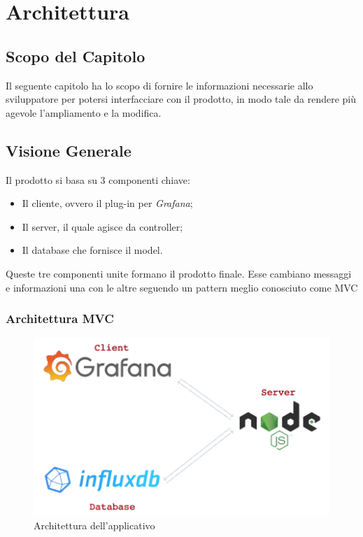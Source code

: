 \section{Architettura}\label{architettura}
\subsection{Scopo del Capitolo}
Il seguente capitolo ha lo scopo di fornire le informazioni necessarie allo sviluppatore per potersi interfacciare con il prodotto, in modo tale da rendere più agevole l'ampliamento e la modifica.

\subsection{Visione Generale}\label{archGenerale}
Il prodotto si basa su 3 componenti chiave: 
\begin{itemize}
	\item Il cliente, ovvero il plug-in per \textit{Grafana}; 
	\item Il server, il quale agisce da controller; 
	\item Il database che fornisce il model.
\end{itemize}
Queste tre componenti unite formano il prodotto finale. Esse cambiano messaggi e informazioni una con le altre seguendo un pattern meglio conosciuto come MVC\glossario 

\subsubsection{Architettura MVC}
\begin{figure}[H]
	\begin{center}
		\includegraphics[scale=0.5]{./images/architettura.png} 
	\end{center}
	\caption{Architettura dell'applicativo}
\end{figure}

